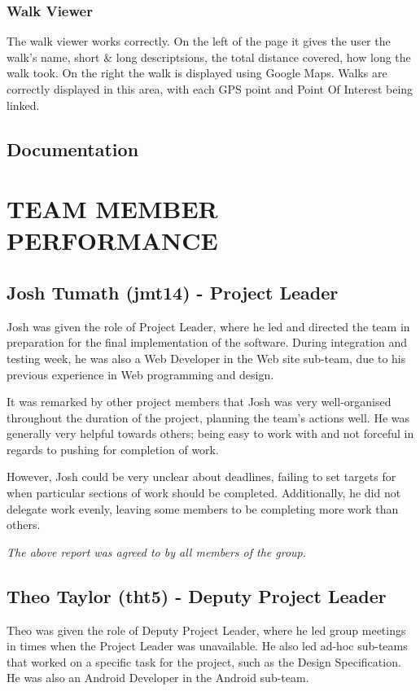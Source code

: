 \documentclass{project}
\begin{document}
\subsubsection{Walk Viewer}
The walk viewer works correctly. On the left of the page it gives the user the walk's name, short \& long descriptsions, the total distance covered, how long the walk took. On the right the walk is displayed using Google Maps. Walks are correctly displayed in this area, with each GPS point and Point Of Interest being linked.

\subsection{Documentation}


\newpage


\section{TEAM MEMBER PERFORMANCE}
\subsection{Josh Tumath (jmt14) - Project Leader}
Josh was given the role of Project Leader, where he led and directed the team in preparation for the final implementation of the software. During integration and testing week, he was also a Web Developer in the Web site sub-team, due to his previous experience in Web programming and design.

It was remarked by other project members that Josh was very well-organised throughout the duration of the project, planning the team's actions well. He was generally very helpful towards others; being easy to work with and not forceful in regards to pushing for completion of work.

However, Josh could be very unclear about deadlines, failing to set targets for when particular sections of work should be completed. Additionally, he did not delegate work evenly, leaving some members to be completing more work than others.

\emph{The above report was agreed to by all members of the group.}


\subsection{Theo Taylor (tht5) - Deputy Project Leader}
Theo was given the role of Deputy Project Leader, where he led group meetings in times when the Project Leader was unavailable. He also led ad-hoc sub-teams that worked on a specific task for the project, such as the Design Specification. He was also an Android Developer in the Android sub-team.
\end{document}
